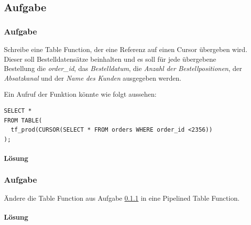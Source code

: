 \subsection{Aufgabe}
\label{subsec:uebung_12.aufgabe_14}

\subsubsection{Aufgabe}
\label{subsubsec:uebung_12.aufgabe_14a}
Schreibe eine Table Function, der eine Referenz auf einen Cursor übergeben wird. Dieser soll Bestelldatensätze beinhalten und es soll für jede übergebene Bestellung die \textit{order\_id}, das \textit{Bestelldatum}, die \textit{Anzahl der Bestellpositionen}, der \textit{Absatzkanal} und der \textit{Name des Kunden} ausgegeben werden.

Ein Aufruf der Funktion könnte wie folgt aussehen:
\begin{verbatim}
SELECT * 
FROM TABLE(
  tf_prod(CURSOR(SELECT * FROM orders WHERE order_id <2356))
);
\end{verbatim}

\paragraph*{Lösung}
\label{subsubsec:uebung_12.aufgabe_14a.loesung}

\subsubsection{Aufgabe}
\label{subsec:uebung_12.aufgabe_14b}
Ändere die Table Function aus Aufgabe \ref{subsubsec:uebung_12.aufgabe_14a} in eine Pipelined Table Function.

\paragraph*{Lösung}
\label{subsubsec:uebung_12.aufgabe_14b.loesung}



